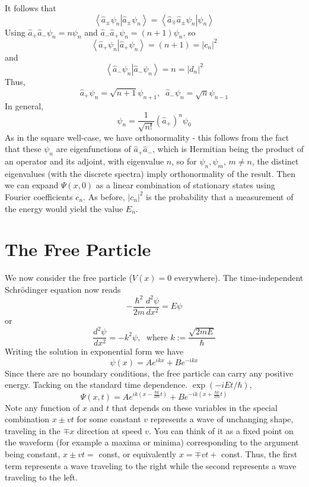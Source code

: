 \documentclass[12pt, a4paper, oneside, openright, titlepage]{book}
\newcommand{\braket}[2]{\left\langle#1\right\vert\left.#2\right\rangle}
\begin{document}
It follows that $$\braket{\hat{a}_{\pm}\psi_n}{\hat{a}_{\pm}\psi_n} = \braket{\hat{a}_{\mp}\hat{a}_{\pm}\psi_n}{\psi_n}$$
Using $\hat{a}_+\hat{a}_-\psi_n = n\psi_n$ and $\hat{a}_-\hat{a}_+\psi_n = (n+1)\psi_n$, so $$\braket{\hat{a}_+\psi_n}{\hat{a}_+\psi_n} = (n+1) = |c_n|^2$$ and $$\braket{\hat{a}_-\psi_n}{\hat{a}_-\psi_n} = n = |d_n|^2$$
Thus, \begin{equation*}
    \boxed{\hat{a}_+\psi_n = \sqrt{n+1}\psi_{n+1},\;\;\hat{a}_-\psi_n = \sqrt{n}\psi_{n-1}}
\end{equation*}
In general, $$\boxed{\psi_n = \frac{1}{\sqrt{n!}}(\hat{a}_+)^n\psi_0}$$
As in the square well-case, we have orthonormality - this follows from the fact that these $\psi_n$ are eigenfunctions of $\hat{a}_+\hat{a}_-$, which is Hermitian being the product of an operator and its adjoint, with eigenvalue $n$, so for $\psi_n,\psi_m$, $m \neq n$, the distinct eigenvalues (with the discrete spectra) imply orthonormality of the result. Then we can expand $\Psi(x,0)$ as a linear combination of stationary states using Fourier coefficients $c_n$. As before, $|c_n|^2$ is the probability that a measurement of the energy would yield the value $E_n$.





\section{The Free Particle}


We now consider the free particle ($V(x) = 0$ everywhere). The time-independent Schr\"{o}dinger equation now reads \begin{equation*}
    -\frac{\hbar^2}{2m}\frac{d^2\psi}{dx^2} = E\psi
\end{equation*}
or \begin{equation*}
    \frac{d^2\psi}{dx^2} = -k^2\psi,\;\text{ where }k := \frac{\sqrt{2mE}}{\hbar}
\end{equation*}
Writing the solution in exponential form we have $$\psi(x) = Ae^{ikx} + Be^{-ikx}$$
Since there are no boundary conditions, the free particle can carry any positive energy. Tacking on the standard time dependence. $\exp(-iEt/\hbar)$, \begin{equation*}
    \Psi(x,t) = Ae^{ik\left(x-\frac{\hbar k}{2m}t\right)} + Be^{-ik\left(x+\frac{\hbar k}{2m}t\right)}
\end{equation*}
Note any function of $x$ and $t$ that depends on these variables in the special combination $x\pm vt$ for some constant $v$ represents a wave of unchanging shape, traveling in the $\mp x$ direction at speed $v$. You can think of it as a fixed point on the waveform (for example a maxima or minima) corresponding to the argument being constant, $x\pm vt = $ const, or equivalently $x = \mp vt + $ const.
Thus, the first term represents a wave traveling to the right while the second represents a wave traveling to the left.
\end{document}
